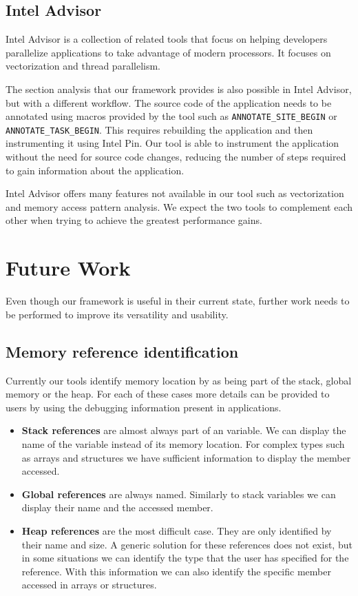 \subsection{Intel Advisor}

Intel Advisor \cite{inteladvisor} is a collection of related tools that focus on helping developers parallelize applications to take advantage of modern processors. It focuses on vectorization and thread parallelism.

The section analysis that our framework provides is also possible in Intel Advisor, but with a different workflow. The source code of the application needs to be annotated using macros provided by the tool such as \texttt{ANNOTATE\_SITE\_BEGIN} or \texttt{ANNOTATE\_TASK\_BEGIN}. This requires rebuilding the application and then instrumenting it using Intel Pin. Our tool is able to instrument the application without the need for source code changes, reducing the number of steps required to gain information about the application.

Intel Advisor offers many features not available in our tool such as vectorization and memory access pattern analysis. We expect the two tools to complement each other when trying to achieve the greatest performance gains.

\section{Future Work}

Even though our framework is useful in their current state, further work needs to be performed to improve its versatility and usability.

\subsection{Memory reference identification}

Currently our tools identify memory location by as being part of the stack, global memory or the heap. For each of these cases more details can be provided to users by using the debugging information present in applications.

\begin{itemize}
	\item \textbf{Stack references} are almost always part of an variable. We can display the name of the variable instead of its memory location. For complex types such as arrays and structures we have sufficient information to display the member accessed.
	
	\item \textbf{Global references} are always named. Similarly to stack variables we can display their name and the accessed member.
	
	\item \textbf{Heap references} are the most difficult case. They are only identified by their name and size. A generic solution for these references does not exist, but in some situations we can identify the type that the user has specified for the reference. With this information we can also identify the specific member accessed in arrays or structures. 
\end{itemize}

